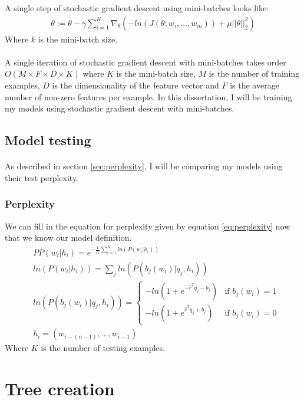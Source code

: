 A single step of stochastic gradient descent using mini-batches looks like:
\begin{align}
\theta := \theta - \gamma \sum_{i=1}^{K} \nabla_\theta \left( -ln(J(\theta;w_i,\dots, w_m)) +  \mu ||\theta||^2_2 \right)
\end{align}
Where $k$ is the mini-batch size.
\paragraph{}
A single iteration of stochastic gradient descent with mini-batches takes order $O(M\times F \times D\times K)$ where $K$ is the mini-batch size, $M$ is the number of training examples, $D$ is the dimensionality of the feature vector and $F$ is the average number of non-zero features per example. In this dissertation, I will be training my models using stochastic gradient descent with mini-batches.

\subsection{Model testing}
\paragraph{}
As described in section \ref{sec:perplexity}, I will be comparing my models using their test perplexity.
\subsubsection{Perplexity}
We can fill in the equation for perplexity given by equation \ref{eq:perplexity} now that we know our model definition.
\begin{align}
&PP(w_i | h_i)=e^{- \frac{1}{K} \sum_{i=1}^K ln( P(w_i | h_i) ) }
\\
&ln(P(w_i | h_i )) = \sum_j ln(P(b_j(w_i) | q_j, h_i)) \nonumber
\\
&ln(P(b_j(w_i) | q_j, h_i)) =  
\begin{cases}
  -ln (1 + e^{-\hat{r}^T q_{j} -b_{j}}) & \text{if } b_j(w_i)  = 1 \\
  -ln (1 + e^{\hat{r}^T q_{j} +b_{j}})     & \text{if } b_j(w_i) = 0
  \end{cases} \nonumber
\\
 & h_i = ( w_{i-(n-1)},\dots, w_{i-1} ) \nonumber
\end{align}
Where $K$ is the number of testing examples. 


\section{Tree creation} \label{sec:treeCreation}
